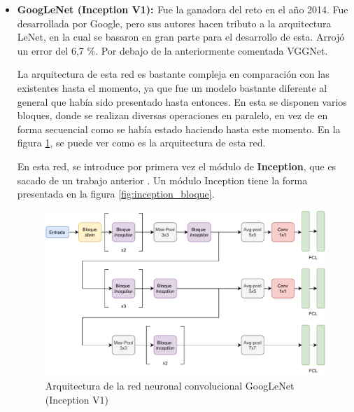 \begin{itemize}
    \item \textbf{GoogLeNet (Inception V1): \cite{szegedy2014going}} Fue la ganadora del reto en el año 2014. Fue desarrollada por Google, pero sus autores hacen tributo a la arquitectura LeNet, en la cual se basaron en gran parte para el desarrollo de esta. Arrojó un error del 6,7 \%. Por debajo de la anteriormente comentada VGGNet.
    
    La arquitectura de esta red es bastante compleja en comparación con las existentes hasta el momento, ya que fue un modelo bastante diferente al general que había sido presentado hasta entonces. En esta se disponen varios bloques, donde se realizan diversas operaciones en paralelo, en vez de en forma secuencial como se había estado haciendo hasta este momento. En la figura \ref{fig:googlenet}, se puede ver como es la arquitectura de esta red.
    
    En esta red, se introduce por primera vez el módulo de \textbf{Inception}, que es sacado de un trabajo anterior \cite{szegedy2014going}. Un módulo Inception tiene la forma presentada en la figura \ref{fig:inception_bloque}.
    
    \begin{figure}[!h]
        \centering
        \includegraphics[width=1\textwidth]{figuras/desarrollo teorico/desarrollo_teorico-Inception V1.pdf}
        \caption{Arquitectura de la red neuronal convolucional GoogLeNet (Inception V1)}
        \label{fig:googlenet}
    \end{figure}
    

\end{itemize}
